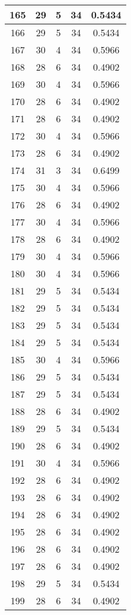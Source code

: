 \documentclass[letterpaper, 12pt]{article}
\begin{document}
\begin{longtable}{|c|c|c|c|c|}
\hline
165 & 29 & 5 & 34 & 0.5434 \\
\hline
166 & 29 & 5 & 34 & 0.5434 \\
\hline
167 & 30 & 4 & 34 & 0.5966 \\
\hline
168 & 28 & 6 & 34 & 0.4902 \\
\hline
169 & 30 & 4 & 34 & 0.5966 \\
\hline
170 & 28 & 6 & 34 & 0.4902 \\
\hline
171 & 28 & 6 & 34 & 0.4902 \\
\hline
172 & 30 & 4 & 34 & 0.5966 \\
\hline
173 & 28 & 6 & 34 & 0.4902 \\
\hline
174 & 31 & 3 & 34 & 0.6499 \\
\hline
175 & 30 & 4 & 34 & 0.5966 \\
\hline
176 & 28 & 6 & 34 & 0.4902 \\
\hline
177 & 30 & 4 & 34 & 0.5966 \\
\hline
178 & 28 & 6 & 34 & 0.4902 \\
\hline
179 & 30 & 4 & 34 & 0.5966 \\
\hline
180 & 30 & 4 & 34 & 0.5966 \\
\hline
181 & 29 & 5 & 34 & 0.5434 \\
\hline
182 & 29 & 5 & 34 & 0.5434 \\
\hline
183 & 29 & 5 & 34 & 0.5434 \\
\hline
184 & 29 & 5 & 34 & 0.5434 \\
\hline
185 & 30 & 4 & 34 & 0.5966 \\
\hline
186 & 29 & 5 & 34 & 0.5434 \\
\hline
187 & 29 & 5 & 34 & 0.5434 \\
\hline
188 & 28 & 6 & 34 & 0.4902 \\
\hline
189 & 29 & 5 & 34 & 0.5434 \\
\hline
190 & 28 & 6 & 34 & 0.4902 \\
\hline
191 & 30 & 4 & 34 & 0.5966 \\
\hline
192 & 28 & 6 & 34 & 0.4902 \\
\hline
193 & 28 & 6 & 34 & 0.4902 \\
\hline
194 & 28 & 6 & 34 & 0.4902 \\
\hline
195 & 28 & 6 & 34 & 0.4902 \\
\hline
196 & 28 & 6 & 34 & 0.4902 \\
\hline
197 & 28 & 6 & 34 & 0.4902 \\
\hline
198 & 29 & 5 & 34 & 0.5434 \\
\hline
199 & 28 & 6 & 34 & 0.4902 \\
\hline
\end{longtable}
\end{document}
